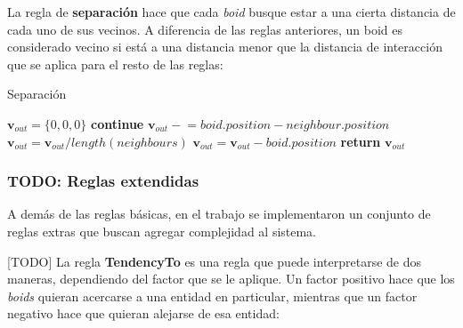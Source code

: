 \documentclass[a4paper]{article}
\begin{document}
            La regla de \textbf{separación} hace que cada \textit{boid} busque estar a una cierta distancia de cada uno de sus vecinos. A diferencia de las reglas anteriores, un boid es considerado vecino si está a una distancia menor que la distancia de interacción que se aplica para el resto de las reglas:

            \begin{algorithm}
                \caption{Separación}\label{pseudo:separation}
                \begin{algorithmic}[1]
                    \State $\bm{v}_{out} = \{0, 0, 0\}$
                            \State \textbf{continue}
                        \EndIf
                        \State $\bm{v}_{out} \mathrel{-}= boid.position - neighbour.position$
                    \EndFor
                    \State $\bm{v}_{out} = \bm{v}_{out} / length(neighbours)$
                    \State $\bm{v}_{out} = \bm{v}_{out} - boid.position$
                    \State \textbf{return} $\bm{v}_{out}$
                \EndProcedure
                \end{algorithmic}
            \end{algorithm}

            \pagebreak
            \subsubsection{TODO: Reglas extendidas}
                A demás de las reglas básicas, en el trabajo se implementaron un conjunto de reglas extras que buscan agregar complejidad al sistema.

                [TODO] La regla \textbf{TendencyTo} es una regla que puede interpretarse de dos maneras, dependiendo del factor que se le aplique. Un factor positivo hace que los \textit{boids} quieran acercarse a una entidad en particular, mientras que un factor negativo hace que quieran alejarse de esa entidad:
\end{document}
